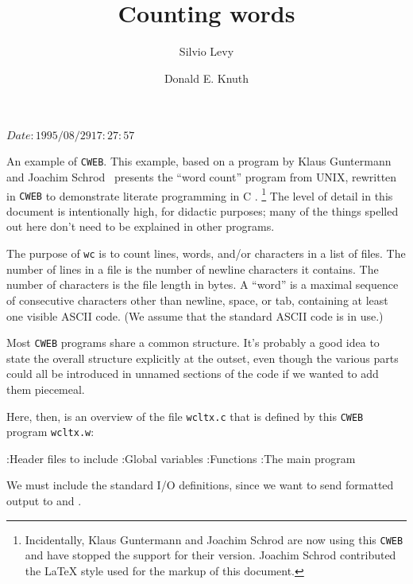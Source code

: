 \documentclass{cweb}
\def\CEE/{C\spacefactor 1000 }
\def\cweb{{\tt CWEB\/}}
\def\UNIX/{{\small UNIX\/}}
\def\wc{{\tt wc\/}}
\begin{document}
\title{Counting words}
\author{Silvio Levy\and Donald E. Knuth}
\begingroup
\def\thefootnote{\hbox{$^*$}}
\endgroup
\RCSdate $Date: 1995/08/29 17:27:57 $

\maketitle





An example of \cweb{}.  This example, based on a program by
Klaus Guntermann and Joachim Schrod~\cite{litprog:schrod:cweb}
presents the ``word count'' program from \UNIX/, rewritten in
\cweb{} to demonstrate literate programming in \CEE/.%
\footnote{%
Incidentally, Klaus Guntermann and Joachim Schrod are now
using this \cweb{} and have stopped the support for their version.
Joachim Schrod contributed the \LaTeX{} style used for the markup of
this document.
}
The level of detail in this document is intentionally high, for
didactic purposes; many of the things spelled out here don't need to
be explained in other programs.

The purpose of \wc{} is to count lines, words, and/or characters in a
list of files. The number of lines in a file is the number of newline
characters it contains. The number of characters is the file length in bytes.
A ``word'' is a maximal sequence of consecutive characters other than
newline, space, or tab, containing at least one visible ASCII code.
(We assume that the standard ASCII code is in use.)

\fi

Most \cweb{} programs share a common structure.  It's probably a
good idea to state the overall structure explicitly at the outset,
even though the various parts could all be introduced in unnamed
sections of the code if we wanted to add them piecemeal.

Here, then, is an overview of the file \texttt{wcltx.c} that is
defined by this \cweb{} program \texttt{wcltx.w}:

\Y\B{}:Header files to include\X\6
:Global variables\X\6
:Functions\X\6
:The main program\X\par
\fi

We must include the standard I/O definitions, since we want to send
formatted output to  and .
\end{document}
